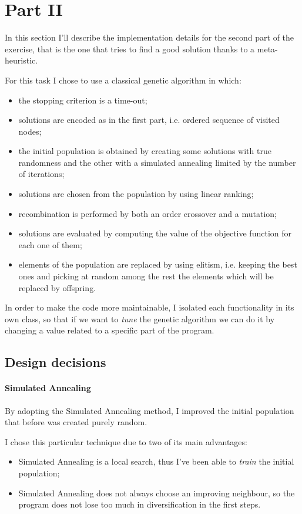 \section{Part II}

In this section I'll describe the implementation details for the second part of
the exercise, that is the one that tries to find a good solution thanks to a
meta-heuristic.

For this task I chose to use a classical genetic algorithm in which:

\begin{itemize}
	\item the stopping criterion is a time-out;
	\item solutions are encoded as in the first part, i.e. ordered sequence of
		visited nodes;
	\item the initial population is obtained by creating some solutions with true
		randomness and the other with a simulated annealing limited by the number
		of iterations;
	\item solutions are chosen from the population by using linear ranking;
	\item recombination is performed by both an order crossover and a mutation;
	\item solutions are evaluated by computing the value of the objective
		function for each one of them;
	\item elements of the population are replaced by using elitism, i.e. keeping
		the best ones and picking at random among the rest the elements which will
		be replaced by offspring.
\end{itemize}

In order to make the code more maintainable, I isolated each functionality in
its own class, so that if we want to \textit{tune} the genetic algorithm we can
do it by changing a value related to a specific part of the program.

\subsection{Design decisions}

\paragraph{Simulated Annealing} By adopting the Simulated Annealing method, I
improved the initial population that before was created purely random.

I chose this particular technique due to two of its main advantages:
\begin{itemize}
	\item Simulated Annealing is a local search, thus I've been able to
		\textit{train} the initial population;
	\item Simulated Annealing does not always choose an improving neighbour, so
	  the program does not lose too much in diversification in the first steps.
\end{itemize}

